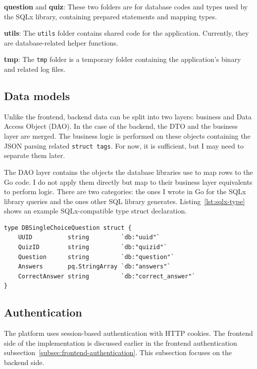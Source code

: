 \textbf{question} and \textbf{quiz}: These two folders are for database codes and types used by the SQLx library, containing prepared statements and mapping types.

\textbf{utils}: The \texttt{utils} folder contains shared code for the application. Currently, they are database-related helper functions.

\textbf{tmp}: The \texttt{tmp} folder is a temporary folder containing the application's binary and related log files.

\subsection{Data models}

Unlike the frontend, backend data can be split into two layers: business and Data Access Object (DAO). In the case of the backend, the DTO and the business layer are merged. The business logic is performed on these objects containing the JSON parsing related \texttt{struct tags}. For now, it is sufficient, but I may need to separate them later.

The DAO layer contains the objects the database libraries use to map rows to the Go code. I do not apply them directly but map to their business layer equivalents to perform logic. There are two categories: the ones I wrote in Go for the SQLx library queries and the ones other SQL library generates. Listing~\ref{lst:sqlx-type} shows an example SQLx-compatible type struct declaration.

\begin{lstlisting}[caption=SQLx-compatible type struct declaration,label=lst:sqlx-type]
type DBSingleChoiceQuestion struct {
    UUID          string         `db:"uuid"`
    QuizID        string         `db:"quizid"`
    Question      string         `db:"question"`
    Answers       pq.StringArray `db:"answers"`
    CorrectAnswer string         `db:"correct_answer"`
}
\end{lstlisting}

\subsection{Authentication}

The platform uses session-based authentication with HTTP cookies. The frontend side of the implementation is discussed earlier in the frontend authentication subsection~\ref{subsec:frontend-authentication}. This subsection focuses on the backend side.


